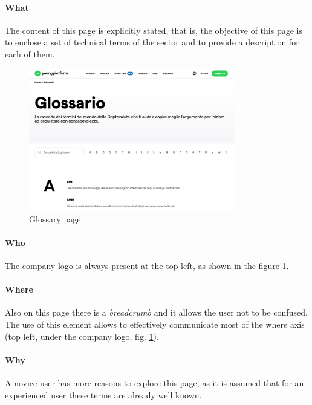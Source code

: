 \paragraph{What}

The content of this page is explicitly stated, that is, the objective of 
this page is to enclose a set of technical terms of the sector and to 
provide a description for each of them.

\begin{figure}[H]
  \centering
  \includegraphics[width=0.80\textwidth]{res/images/internal-pages/glossary/glossary-1.png}
  \caption{Glossary page.}
  \label{fig:glossary-1}
\end{figure}

\paragraph{Who}

The company logo is always present at the top left, as shown in the figure 
\ref{fig:glossary-1}.

\paragraph{Where}

Also on this page there is a \textit{breadcrumb} and it allows the user not 
to be confused. The use of this element allows to effectively communicate 
most of the where axis (top left, under the company logo, fig. 
\ref{fig:glossary-1}).

\paragraph{Why}

A novice user has more reasons to explore this page, as it is assumed that 
for an experienced user these terms are already well known.

